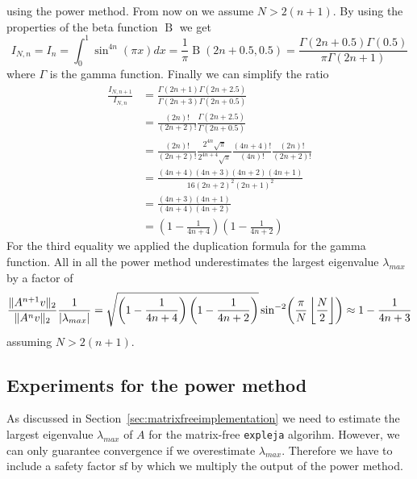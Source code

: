 \documentclass{scrartcl}
\begin{document}
	using the power method. From now on we assume $N > 2(n+1)$. By using the properties of the beta function $\operatorname{B}$ we get
	\[
	I_{N,n} = I_{n} = \int_{0}^{1} \sin^{4n}(\pi x)dx = \frac{1}{\pi} \operatorname{B}(2n+0.5,0.5) = \frac{\Gamma(2n + 0.5)\Gamma(0.5)}{\pi \Gamma(2n + 1)}
	\]
	\noindent where $\Gamma$ is the gamma function. Finally we can simplify the ratio
	\begin{align*}
		\frac{I_{N,n+1}}{I_{N,n}} &=   
		\frac{\Gamma(2n + 1)\Gamma(2n + 2.5)}{\Gamma(2n + 3)\Gamma(2n + 0.5)} \\&= 
		\frac{(2n)!}{(2n+2)!}
		\frac{\Gamma(2n + 2.5)}{\Gamma(2n + 0.5)}\\&=
		\frac{(2n)!}{(2n+2)!}
		\frac{2^{4n}\sqrt\pi}{2^{4n+4}\sqrt\pi}
		\frac{(4n+4)!}{(4n)!}
		\frac{(2n)!}{(2n+2)!} \\&=
		\frac{(4n+4)(4n+3)(4n+2)(4n+1)}{16(2n+2)^2(2n+1)^2} \\&=
		\frac{(4n+3)(4n+1)}{(4n+4)(4n+2)}\\&=
		\left(1-\frac{1}{4n+4}\right)\left(1-\frac{1}{4n+2}\right)
	\end{align*}
	For the third equality we applied the duplication formula for the gamma function. All in all the power method underestimates the largest eigenvalue $\lambda_{max}$ by a factor of 
	\[
		\frac{\lVert A^{n+1}v\rVert_2}{\lVert A^{n}v\rVert_2}\frac{1}{\lvert\lambda_{max}\rvert} =
		\sqrt{\left(1-\frac{1}{4n+4}\right)\left(1-\frac{1}{4n+2}\right)}\sin^{-2}\!\left(\frac{\pi}{N}\left\lfloor\frac{N}{2}\right\rfloor\right) \approx 1-\frac{1}{4n+3}
	\]
	assuming $N>2(n+1)$. 
\subsection{Experiments for the power method}
	As discussed in Section~\ref{sec:matrixfreeimplementation} we need to estimate the largest eigenvalue $\lambda_{max}$ of $A$ for the matrix-free \texttt{expleja} algorihm. However, we can only guarantee convergence if we overestimate $\lambda_{max}$. Therefore we have to include a safety factor $\text{sf}$ by which we multiply the output of the power method. 
	
\end{document}
